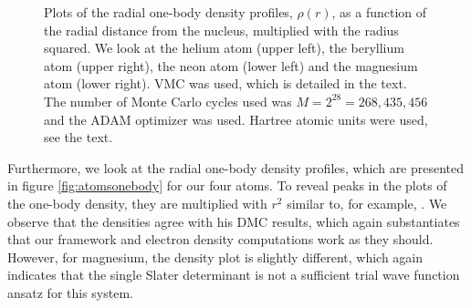 \begin{figure}
	\caption{Plots of the radial one-body density profiles, $\rho(r)$, as a function of the radial distance from the nucleus, multiplied with the radius squared. We look at the helium atom (upper left), the beryllium atom (upper right), the neon atom (lower left) and the magnesium atom (lower right). VMC was used, which is detailed in the text. The number of Monte Carlo cycles used was $M=2^{28}=268,435,456$ and the ADAM optimizer was used. Hartree atomic units were used, see the text.}
	\label{fig:atomsonebody}
\end{figure}

Furthermore, we look at the radial one-body density profiles, which are presented in figure \eqref{fig:atomsonebody} for our four atoms. To reveal peaks in the plots of the one-body density, they are multiplied with $r^2$ similar to, for example, \citet{hogberget_quantum_2013}. We observe that the densities agree with his DMC results, which again substantiates that our framework and electron density computations work as they should. However, for magnesium, the density plot is slightly different, which again indicates that the single Slater determinant is not a sufficient trial wave function ansatz for this system. 
